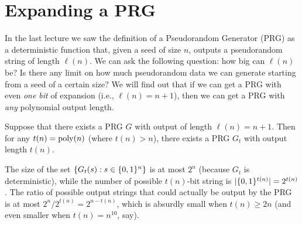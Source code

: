 \documentclass[11pt]{article}
\begin{document}
\thispagestyle{fancy}           %


\section{Expanding a PRG}
\label{sec:expanding-prg}

In the last lecture we saw the definition of a Pseudorandom Generator
(PRG) as a deterministic function that, given a seed of size $n$,
outputs a pseudorandom string of length $\ell(n)$.  We can ask the
following question: how big can $\ell(n)$ be?  Is there any limit on
how much pseudorandom data we can generate starting from a seed of a
certain size?  We will find out that if we can get a PRG with even
\emph{one bit} of expansion (i.e., $\ell(n) = n+1$), then we can get a
PRG with \emph{any} polynomial output length.

\begin{theorem}
  \label{thm:prg-expansion}
  Suppose that there exists a PRG $G$ with output of length
  $\ell(n)=n+1$.  Then for any $t(n)=\operatorname{poly}(n)$ (where $t(n) > n$),
  there exists a PRG $G_t$ with output length $t(n)$.
\end{theorem}

\begin{remark}
  The size of the set $\{G_{t}(s) : s \in \{0,1\}^{n}\}$ is at most
  $2^n$ (because $G_{t}$ is deterministic), while the number of
  possible $t(n)$-bit string is $|\{0,1\}^{t(n)}| = 2^{t(n)}$.  The ratio
  of possible output strings that could actually be output by the PRG
  is at most $2^n/2^{t(n)}= 2^{n-t(n)}$, which is absurdly small when
  $t(n) \geq 2n$ (and even smaller when $t(n) = n^{10}$, say).
\end{remark}
\end{document}
